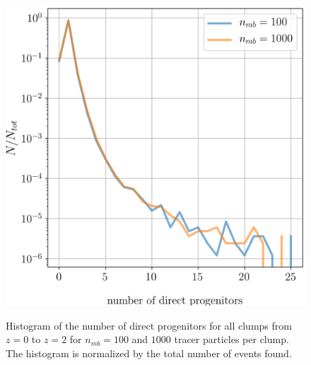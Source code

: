 \begin{figure}
	\centering
	\includegraphics[width=.9\linewidth, keepaspectratio]{images/tree-statistics-sussing-threshold/branching-ratio-ntrace.png}\\%
	\caption{
		Histogram of the number of direct progenitors for all clumps from $z = 0$ to $z = 2$ for $n_{mb} = 100$ and $1000$ tracer particles per clump.
		The histogram is normalized by the total number of events found.
	}%
	\label{fig:sussing-branching-ratio}
\end{figure}

